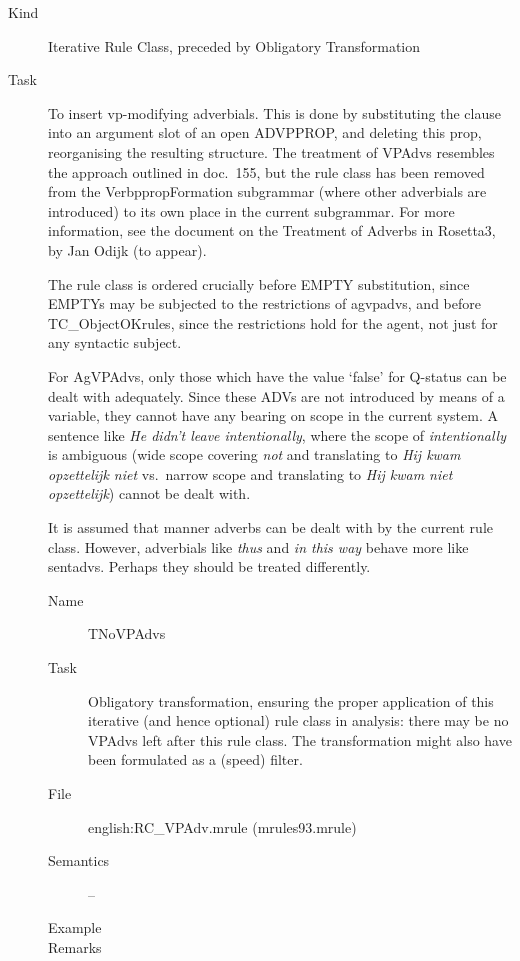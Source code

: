 \begin{description}
\item[Kind] Iterative Rule Class, preceded by Obligatory Transformation
\item[Task] To insert  vp-modifying adverbials. This is done by 
substituting the clause into an argument slot of an open ADVPPROP, and deleting 
this prop, reorganising the resulting structure. 
The treatment of VPAdvs resembles the approach outlined in doc.\ 
155, but the rule class has been removed from the VerbppropFormation subgrammar 
(where other adverbials are introduced) to its own place in the current 
subgrammar. For more information, see the document on the Treatment of Adverbs 
in Rosetta3, by Jan Odijk (to appear).

The rule class is ordered crucially before EMPTY substitution, since EMPTYs may 
be subjected to the restrictions of agvpadvs, and before TC\_ObjectOKrules, 
since the restrictions hold for the agent, not just for any syntactic subject.

For AgVPAdvs, only those which have the value `false' for Q-status can be dealt 
with adequately. Since these ADVs are not introduced by means of a variable, 
they cannot have any bearing on scope in the current system. A sentence like 
{\em He didn't leave intentionally\/}, where the scope of {\em intentionally\/} 
is ambiguous (wide scope covering {\em not\/} and translating to {\em Hij kwam 
opzettelijk 
niet\/} vs.\ narrow scope and translating to {\em Hij kwam niet opzettelijk\/}) 
cannot be dealt with.

It is assumed that manner adverbs can be dealt with by the current rule class. 
However, adverbials like {\em thus\/} and {\em in this way\/} behave more like 
sentadvs. Perhaps they should be treated differently.

\vspace{1 cm}
\begin{description}
\item[Name] TNoVPAdvs
\item[Task] Obligatory transformation, ensuring the proper application  of this 
iterative (and hence 
optional) rule class in analysis: there may be no VPAdvs left after this 
rule class. The transformation might also have been formulated as a 
(speed) filter.
\item[File] english:RC\_VPAdv.mrule (mrules93.mrule)
\item[Semantics] --
\item[Example] 
\item[Remarks] 
\end{description}


\end{description}

